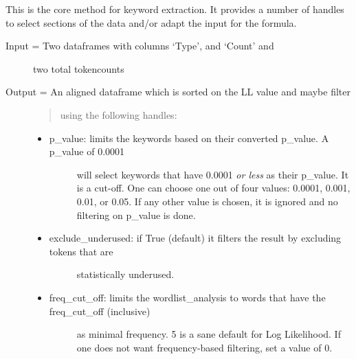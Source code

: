 \documentclass[letterpaper,10pt,english]{sphinxmanual}
\begin{document}
\begin{fulllineitems}
\label{apidoc:keywords.extract_keywords}
This is the core method for keyword extraction. It provides a number 
of handles to select sections of the data and/or adapt the input for the
formula.
\begin{description}
\item[{Input = Two dataframes with columns `Type', and `Count' and }] \leavevmode
two total tokencounts

\item[{Output = An aligned dataframe which is sorted on the LL value and maybe filter }] \leavevmode\begin{quote}

using the following handles:
\end{quote}
\begin{itemize}
\item {} \begin{description}
\item[{p\_value: limits the keywords based on their converted p\_value. A p\_value of 0.0001}] \leavevmode
will select keywords that have 0.0001 \emph{or less} as their p\_value. It is a 
cut-off. One can choose one out of four values: 0.0001, 0.001, 0.01, or 0.05.
If any other value is chosen, it is ignored and no filtering on p\_value is done.

\end{description}

\item {} \begin{description}
\item[{exclude\_underused: if True (default) it filters the result by excluding tokens that are }] \leavevmode
statistically underused.

\end{description}

\item {} \begin{description}
\item[{freq\_cut\_off: limits the wordlist\_analysis to words that have the freq\_cut\_off (inclusive) }] \leavevmode
as minimal frequency. 5 is a sane default for Log Likelihood. If one does not 
want frequency-based filtering, set a value of 0.


\end{description}
\end{itemize}
\end{description}
\end{fulllineitems}
\end{document}
